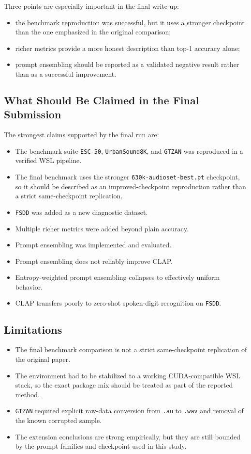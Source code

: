 \documentclass[11pt]{article}
\newcommand{\dataset}[1]{\texttt{#1}}
\begin{document}
Three points are especially important in the final write-up:
\begin{itemize}[leftmargin=1.25em]
  \item the benchmark reproduction was successful, but it uses a stronger
  checkpoint than the one emphasized in the original comparison;
  \item richer metrics provide a more honest description than top-1 accuracy
  alone;
  \item prompt ensembling should be reported as a validated negative result
  rather than as a successful improvement.
\end{itemize}

\subsection{What Should Be Claimed in the Final Submission}

The strongest claims supported by the final run are:
\begin{itemize}[leftmargin=1.25em]
  \item The benchmark suite \dataset{ESC-50}, \dataset{UrbanSound8K}, and
  \dataset{GTZAN} was reproduced in a verified WSL pipeline.
  \item The final benchmark uses the stronger
  \dataset{630k-audioset-best.pt} checkpoint, so it should be described as an
  improved-checkpoint reproduction rather than a strict same-checkpoint
  replication.
  \item \dataset{FSDD} was added as a new diagnostic dataset.
  \item Multiple richer metrics were added beyond plain accuracy.
  \item Prompt ensembling was implemented and evaluated.
  \item Prompt ensembling does not reliably improve CLAP.
  \item Entropy-weighted prompt ensembling collapses to effectively uniform
  behavior.
  \item CLAP transfers poorly to zero-shot spoken-digit recognition on
  \dataset{FSDD}.
\end{itemize}

\subsection{Limitations}

\begin{itemize}[leftmargin=1.25em]
  \item The final benchmark comparison is not a strict same-checkpoint
  replication of the original paper.
  \item The environment had to be stabilized to a working CUDA-compatible WSL
  stack, so the exact package mix should be treated as part of the reported
  method.
  \item \dataset{GTZAN} required explicit raw-data conversion from
  \dataset{.au} to \dataset{.wav} and removal of the known corrupted sample.
  \item The extension conclusions are strong empirically, but they are still
  bounded by the prompt families and checkpoint used in this study.
\end{itemize}
\end{document}
